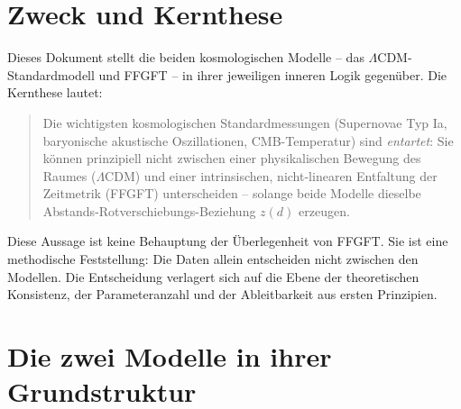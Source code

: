 %
%

\section*{Zweck und Kernthese}

Dieses Dokument stellt die beiden kosmologischen Modelle -- das $\Lambda$CDM-
Standardmodell und FFGFT -- in ihrer jeweiligen inneren Logik gegenüber.
Die Kernthese lautet:

\begin{quote}
Die wichtigsten kosmologischen Standardmessungen (Supernovae Typ Ia,
baryonische akustische Oszillationen, CMB-Temperatur) sind \emph{entartet}:
Sie können prinzipiell nicht zwischen einer physikalischen Bewegung des
Raumes ($\Lambda$CDM) und einer intrinsischen, nicht-linearen Entfaltung
der Zeitmetrik (FFGFT) unterscheiden -- solange beide Modelle dieselbe
Abstands-Rotverschiebungs-Beziehung $z(d)$ erzeugen.
\end{quote}

Diese Aussage ist keine Behauptung der Überlegenheit von FFGFT. Sie ist
eine methodische Feststellung: Die Daten allein entscheiden nicht zwischen
den Modellen. Die Entscheidung verlagert sich auf die Ebene der
theoretischen Konsistenz, der Parameteranzahl und der Ableitbarkeit aus
ersten Prinzipien.

\section{Die zwei Modelle in ihrer Grundstruktur}

